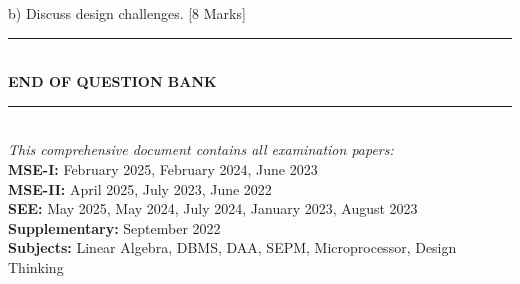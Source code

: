 \documentclass[11pt,a4paper]{article}
\begin{document}
b) Discuss design challenges. \hfill [8 Marks]

\vspace{2cm}
\begin{center}
\rule{\textwidth}{1pt}\\[0.5cm]
{\Large\bfseries END OF QUESTION BANK}\\[0.3cm]
\rule{\textwidth}{1pt}\\[1cm]
\textit{This comprehensive document contains all examination papers:}\\[0.3cm]
\textbf{MSE-I:} February 2025, February 2024, June 2023\\
\textbf{MSE-II:} April 2025, July 2023, June 2022\\
\textbf{SEE:} May 2025, May 2024, July 2024, January 2023, August 2023\\
\textbf{Supplementary:} September 2022\\[0.5cm]
\textbf{Subjects:} Linear Algebra, DBMS, DAA, SEPM, Microprocessor, Design Thinking
\end{center}
\end{document}
